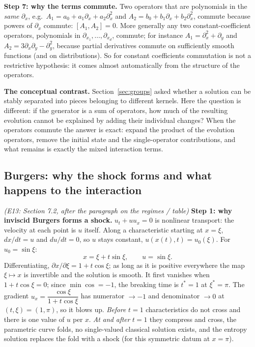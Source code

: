 \documentclass[11pt]{article}
\theoremstyle{plain}
\theoremstyle{definition}
\theoremstyle{remark}
\begin{document}
\medskip\textbf{Step 7: why the terms commute.} Two operators that are polynomials in the \emph{same} $\partial_x$, e.g.\ $A_1=a_0+a_1\partial_x+a_2\partial_x^2$ and $A_2=b_0+b_1\partial_x+b_2\partial_x^2$, commute because powers of $\partial_x$ commute: $[A_1,A_2]=0$. More generally any two constant-coefficient operators, polynomials in $\partial_{x_1},\dots,\partial_{x_d}$, commute; for instance $A_1=\partial_x^2+\partial_y$ and $A_2=3\partial_x\partial_y-\partial_y^2$, because partial derivatives commute on sufficiently smooth functions (and on distributions). So for constant coefficients commutation is not a restrictive hypothesis: it comes almost automatically from the structure of the operators.

\medskip\textbf{The conceptual contrast.} Section~\ref{sec:groups} asked whether a solution can be stably separated into pieces belonging to different kernels. Here the question is different: if the generator is a sum of operators, how much of the resulting evolution cannot be explained by adding their individual changes? When the operators commute the answer is exact: expand the product of the evolution operators, remove the initial state and the single-operator contributions, and what remains is exactly the mixed interaction terms.

\subsection{Burgers: why the shock forms and what happens to the interaction}\label{expl:E13}
\noindent\emph{(E13: Section 7.2, after the paragraph on the regimes / table)}
\textbf{Step 1: why inviscid Burgers forms a shock.} $u_t+uu_x=0$ is nonlinear transport: the velocity at each point is $u$ itself. Along a characteristic starting at $x=\xi$, $dx/dt=u$ and $du/dt=0$, so $u$ stays constant, $u(x(t),t)=u_0(\xi)$. For $u_0=\sin\xi$:
\[
x=\xi+t\sin\xi,\qquad u=\sin\xi .
\]
Differentiating, $\partial x/\partial\xi=1+t\cos\xi$; as long as it is positive everywhere the map $\xi\mapsto x$ is invertible and the solution is smooth. It first vanishes when $1+t\cos\xi=0$; since $\min\cos=-1$, the breaking time is $t^*=1$ at $\xi^*=\pi$. The gradient $u_x=\dfrac{\cos\xi}{1+t\cos\xi}$ has numerator $\to-1$ and denominator $\to0$ at $(t,\xi)=(1,\pi)$, so it blows up. \emph{Before $t=1$} characteristics do not cross and there is one value of $u$ per $x$. \emph{At and after} $t=1$ they compress and cross, the parametric curve folds, no single-valued classical solution exists, and the entropy solution replaces the fold with a shock (for this symmetric datum at $x=\pi$).
\end{document}
